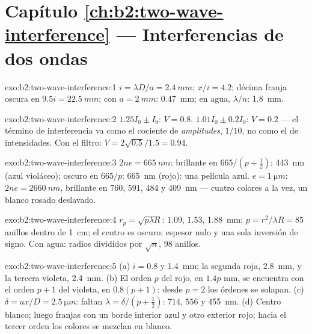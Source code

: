 \section*{Capítulo \ref{ch:b2:two-wave-interference} --- Interferencias de dos ondas}

\begin{solution}{exo:b2:two-wave-interference:1}
$i = \lambda D/a = \qty{2.4}{mm}$; $x/i = 4.2$; décima franja oscura en $9.5i = \qty{22.5}{mm}$;
con $a = \qty{2}{mm}$: \qty{0.47}{mm}; en agua, $\lambda/n$: \qty{1.8}{mm}.
\end{solution}

\begin{solution}{exo:b2:two-wave-interference:2}
$1.25I_0 \pm I_0$: $V = 0.8$. $1.01I_0 \pm 0.2I_0$: $V = 0.2$ --- el término de interferencia
va como el cociente de \emph{amplitudes}, $1/10$, no como el de intensidades. Con el filtro:
$V = 2\sqrt{0.5}/1.5 = 0.94$.
\end{solution}

\begin{solution}{exo:b2:two-wave-interference:3}
$2ne = \qty{665}{nm}$: brillante en $665/(p + \tfrac12)$: \qty{443}{nm} (azul violáceo);
oscuro en $665/p$: \qty{665}{nm} (rojo): una película azul. $e = \qty{1}{\micro m}$: $2ne = \qty{2660}{nm}$,
brillante en $760$, $591$, $484$ y \qty{409}{nm} --- cuatro colores a la vez, un
blanco rosado deslavado.
\end{solution}

\begin{solution}{exo:b2:two-wave-interference:4}
$r_p = \sqrt{p\lambda R}$: $1.09$, $1.53$, \qty{1.88}{mm}; $p = r^2/\lambda R = 85$ anillos dentro de
\qty{1}{cm}; el centro es oscuro: espesor nulo y una sola inversión de signo. Con agua:
radios divididos por $\sqrt n$, $98$ anillos.
\end{solution}

\begin{solution}{exo:b2:two-wave-interference:5}
(a) $i = 0.8$ y \qty{1.4}{mm}; la segunda roja, \qty{2.8}{mm}, y la tercera violeta, \qty{2.4}{mm}.
(b) El orden $p$ del rojo, en $1.4p$ mm, se encuentra con el orden $p + 1$ del violeta, en $0.8(p + 1)$: desde
$p = 2$ los órdenes se solapan. (c) $\delta = ax/D = \qty{2.5}{\micro m}$: faltan $\lambda = \delta/(p +
\tfrac12)$: $714$, $556$ y \qty{455}{nm}. (d) Centro blanco; luego franjas con un
borde interior azul y otro exterior rojo; hacia el tercer orden los colores
se mezclan en blanco.
\end{solution}

